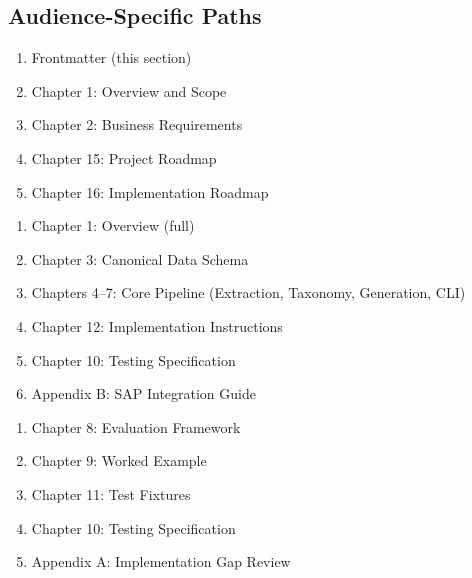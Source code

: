 \subsection*{Audience-Specific Paths}

\begin{tcolorbox}[colback=gray!5,colframe=gray!50,title=\faIcon{user-graduate} For Project Managers / Business Owners]
\begin{enumerate}
    \item Frontmatter (this section)
    \item Chapter 1: Overview and Scope
    \item Chapter 2: Business Requirements
    \item Chapter 15: Project Roadmap
    \item Chapter 16: Implementation Roadmap
\end{enumerate}
\end{tcolorbox}

\begin{tcolorbox}[colback=gray!5,colframe=gray!50,title=\faIcon{laptop-code} For Implementers / Developers]
\begin{enumerate}
    \item Chapter 1: Overview (full)
    \item Chapter 3: Canonical Data Schema
    \item Chapters 4--7: Core Pipeline (Extraction, Taxonomy, Generation, CLI)
    \item Chapter 12: Implementation Instructions
    \item Chapter 10: Testing Specification
    \item Appendix B: SAP Integration Guide
\end{enumerate}
\end{tcolorbox}

\begin{tcolorbox}[colback=gray!5,colframe=gray!50,title=\faIcon{microscope} For Quality / Evaluation Engineers]
\begin{enumerate}
    \item Chapter 8: Evaluation Framework
    \item Chapter 9: Worked Example
    \item Chapter 11: Test Fixtures
    \item Chapter 10: Testing Specification
    \item Appendix A: Implementation Gap Review
\end{enumerate}
\end{tcolorbox}

